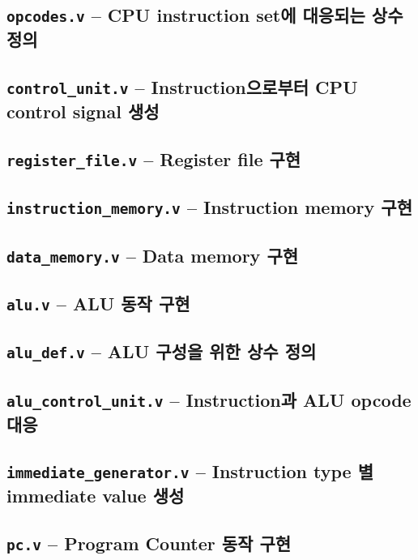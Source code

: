 \documentclass{scrartcl}
\begin{document}
\subsection{\texttt{opcodes.v} -- CPU instruction set에 대응되는 상수 정의}

\subsection{\texttt{control\_unit.v} -- Instruction으로부터 CPU control signal 생성}

\subsection{\texttt{register\_file.v} -- Register file 구현}

\subsection{\texttt{instruction\_memory.v} -- Instruction memory 구현}

\subsection{\texttt{data\_memory.v} -- Data memory 구현}

\subsection{\texttt{alu.v} -- ALU 동작 구현}

\subsection{\texttt{alu\_def.v} -- ALU 구성을 위한 상수 정의}

\subsection{\texttt{alu\_control\_unit.v} -- Instruction과 ALU opcode 대응}

\subsection{\texttt{immediate\_generator.v} -- Instruction type 별 immediate value 생성}

\subsection{\texttt{pc.v} -- Program Counter 동작 구현}
\end{document}
